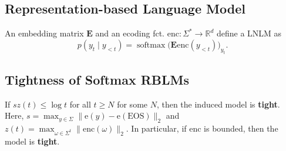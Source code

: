 \subsection*{Representation-based Language Model}
An embedding matrix $\mathbf{E}$ and an ecoding fct. $\text{enc}:\Sigma^*\rightarrow\mathbb{R}^d$ define a LNLM as $$p(y_t\mid y_{<t})=\operatorname{softmax}\big(\mathbf{E}\text{enc}(y_{<t})\big)_{y_t}.$$

\subsection*{Tightness of Softmax RBLMs}
If $sz(t)\leq \log t$ for all $t\geq N$ for some $N$, then the induced model is \textbf{tight}. Here, $s=\max_{y\in\Sigma} \|\text{e}(y)-\text{e}(\text{EOS})\|_2$ and $z(t)=\max_{\omega\in\Sigma^t}\|\text{enc}(\omega)\|_2$. In particular, if $\text{enc}$ is bounded, then the model is \textbf{tight}.